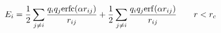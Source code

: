 \documentclass[12pt]{article}
\begin{document}
$$
  E_i = \frac{1}{2} \sum_{j \neq i} 
  \frac{q_i q_j {\rm erfc}(\alpha r_{ij})}{r_{ij}} + 
  \frac{1}{2} \sum_{j \neq i} 
  \frac{q_i q_j {\rm erf}(\alpha r_{ij})}{r_{ij}} \qquad r < r_c
$$
\end{document}
